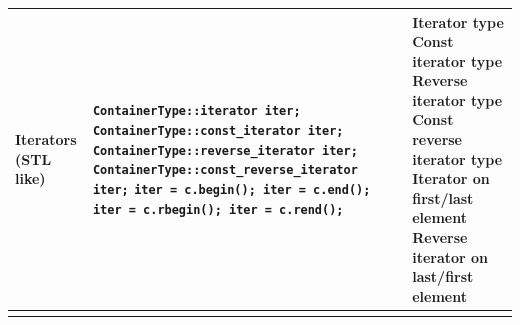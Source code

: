 \documentclass[letterpaper,10pt]{article}
\newcommand{\doublehlinethree}{\hline & & \\ [-10pt] \hline}
\begin{document}
\begin{center}
\begin{tabular}{|p{1.1in}|p{3.1in}|p{2.6in}|}
          Iterators \newline
          (STL like)
          &
          \texttt{ContainerType::iterator iter;} \newline
          \texttt{ContainerType::const\_iterator iter;} \newline
          \texttt{ContainerType::reverse\_iterator iter;} \newline
          \texttt{ContainerType::const\_reverse\_iterator iter;} \newline
          \texttt{iter = c.begin(); iter = c.end();} \newline
          \texttt{iter = c.rbegin(); iter = c.rend();}
          &
          Iterator type \newline
          Const iterator type \newline
          Reverse iterator type \newline
          Const reverse iterator type\newline
          Iterator on first/last element \newline
          Reverse iterator on last/first element
          \\
          \doublehlinethree


\end{tabular}
\end{center}
\end{document}
